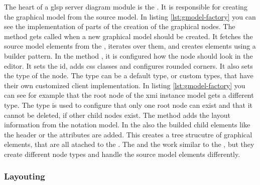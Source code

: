   The heart of a \ac{glsp} server diagram module is the . It is responsible for creating the graphical model from the source model. In listing \ref{lst:gmodel-factory} you can see the implementation of parts of the creation of the graphical nodes. The method  gets called when a new graphical model should be created. It fetches the source model elements from the , iterates over them, and creates  elements using a builder pattern. In the method , it is configured how the node should look in the editor. It sets the id, adds \acs{css} classes and  configures rounded corners. It also sets the type of the node. The type can be a default type, or custom types, that have their own customized client implementation. In listing \ref{lst:gmodel-factory} you can see for example that the root node of the \ac{xmi} instance model gets a different type. The type is used to configure that only one root node can exist and that it cannot be deleted, if other child nodes exist. The method  adds the layout information from the notation model. In the  also the builded child elements like the header or the attributes are added. This creates a tree strucutre of graphical elements, that are all atached to the . The  and the  work similar to the , but they create different node types and handle the source model elements differently.


  \subsubsection{Layouting}
  \label{subsec:layouting}

